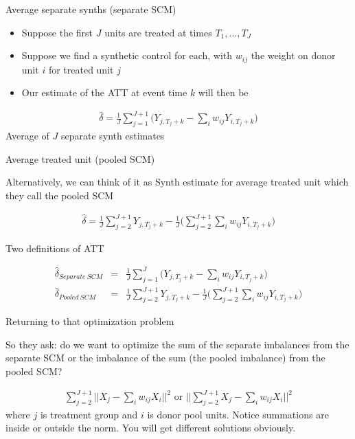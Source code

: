 \documentclass{beamer}
\begin{document}
\begin{frame}{Average separate synths (separate SCM)}

\begin{itemize}
\item Suppose the first $J$ units are treated at times $T_1, \dots, T_J$
\item Suppose we find a synthetic control for each, with $w_{ij}$ the weight on donor unit $i$ for treated unit $j$
\item Our estimate of the ATT at event time $k$ will then be
\end{itemize}

\begin{eqnarray*}
\widehat{\delta} = \frac{1}{J} \sum_{j=1}^{J+1} \bigg ( Y_{j,T_j+k} - \sum_i w_{ij} Y_{i,T_j+k} \bigg )
\end{eqnarray*}Average of $J$ separate synth estimates

\end{frame}


\begin{frame}{Average treated unit (pooled SCM)}

Alternatively, we can think of it as Synth estimate for average treated unit which they call the pooled SCM

\begin{eqnarray*}
\widehat{\delta} = \frac{1}{J} \sum_{j=2}^{J+1} Y_{j,T_j+k} - \frac{1}{J} \bigg ( \sum_{j=2}^{J+1} \sum_i w_{ij} Y_{i,T_j+k} \bigg )
\end{eqnarray*}

\end{frame}


\begin{frame}{Two definitions of ATT}


\begin{eqnarray*}
\widehat{\delta}_{Separate\ SCM} &=& \frac{1}{J} \sum_{j=1}^J \bigg ( Y_{j,T_j+k} - \sum_i w_{ij} Y_{i,T_j+k} \bigg ) \\
\widehat{\delta}_{Pooled\ SCM}&=& \frac{1}{J} \sum_{j=2}^{J+1} Y_{j,T_j+k} - \frac{1}{J} \bigg ( \sum_{j=2}^{J+1} \sum_i w_{ij} Y_{i,T_j+k} \bigg )
\end{eqnarray*}

\end{frame}

\begin{frame}{Returning to that optimization problem}

So they ask: do we want to optimize the sum of the separate imbalances from the separate SCM or the imbalance of the sum (the pooled imbalance) from the pooled SCM?

\begin{eqnarray*}
\sum_{j=2}^{J+1} || X_j - \sum_i w_{ij}X_i ||^2\textrm{   or  } ||\sum_{j=2}^{J+1} X_j - \sum_i w_{ij} X_i ||^2
\end{eqnarray*}where $j$ is treatment group and $i$ is donor pool units. Notice summations are inside or outside the norm. You will get different solutions obviously.
\end{frame}
\end{document}
